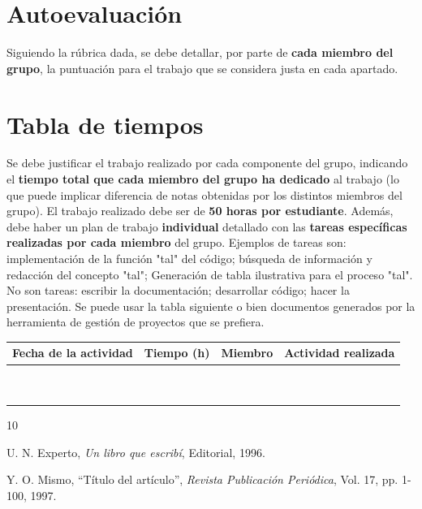 \documentclass[a4paper]{article}
\begin{document}
\section{Autoevaluación}

Siguiendo la rúbrica dada, se debe detallar, por parte de  \textbf{cada miembro del grupo}, la puntuación para el trabajo que se considera justa en cada apartado. 

\section{Tabla de tiempos}


Se debe justificar el trabajo realizado por cada componente del grupo, indicando el {\bf tiempo total que cada miembro del grupo ha dedicado} al trabajo (lo que puede implicar diferencia de notas obtenidas por los distintos miembros del grupo). El trabajo realizado debe ser de {\bf 50 horas por estudiante}. Además, debe haber un plan de trabajo \textbf{individual} detallado con las {\bf tareas específicas realizadas por cada miembro} del grupo. Ejemplos de tareas son: implementación de la función "tal" del código; búsqueda de información y redacción del concepto "tal"; Generación de tabla ilustrativa para el proceso "tal". No son tareas: escribir la documentación; desarrollar código; hacer la presentación. Se puede usar la tabla siguiente o bien documentos generados por la herramienta de gestión de proyectos que se prefiera.

\begin{center}
\begin{tabular}{|c|c|c|c|}
\hline
 Fecha de la
 actividad 
& Tiempo (h)
& Miembro
& Actividad realizada
\\\hline
\mbox{ }&\mbox{}&\mbox{ }&\mbox{}\\
\mbox{ }&\mbox{}&\mbox{ }&\mbox{}\\\hline
\end{tabular}
\end{center}


\begin{thebibliography}{10}



U. N. Experto, \emph{Un libro que escribí},
Editorial, 1996.

Y. O. Mismo,
``Título del artículo'',
\emph{Revista Publicación Periódica}, Vol. 17, pp. 1-100, 1997.
\end{thebibliography}

\newpage 
\end{document}
